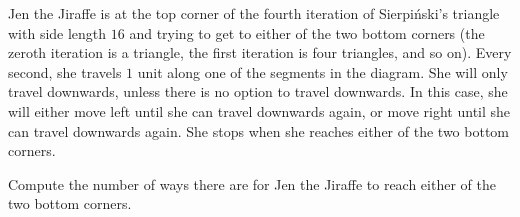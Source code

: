 Jen the Jiraffe is at the top corner of the fourth iteration of Sierpi\'nski's triangle with side length $16$ and trying to get to either of the two bottom corners (the zeroth iteration is a triangle, the first iteration is four triangles, and so on). Every second, she travels $1$ unit along one of the segments in the diagram. She will only travel downwards, unless there is no option to travel downwards. In this case, she will either move left until she can travel downwards again, or move right until she can travel downwards again. She stops when she reaches either of the two bottom corners.

Compute the number of ways there are for Jen the Jiraffe to reach either of the two bottom corners.

